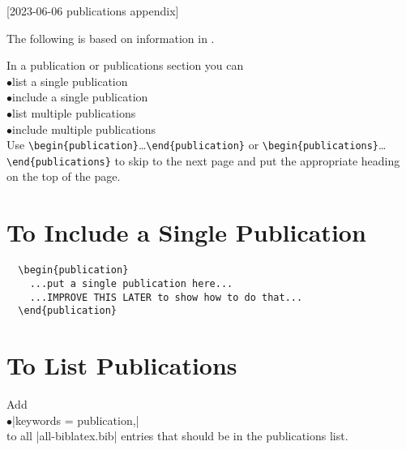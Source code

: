 [2023-06-06 publications appendix]

\index{\verb+\begin{publications}+}
    
The following is based on information in
\cite{template1,template2,template3}.

\renewcommand{\I}{\hspace*{2\ZZparindent}$\bullet$\hspace*{1.5em}}

In a publication or publications section you can\\
  \I list a single publication\\
  \I include a single publication\\
  \I list multiple publications\\
  \I include multiple publications\\
Use\newline
\hspace*{0.5in}\verb+\begin{publication}+\ldots\verb+\end{publication}+\newline
or\newline
\hspace*{0.5in}\verb+\begin{publications}+\ldots\verb+\end{publications}+\newline
to skip to the next page and put the appropriate heading on the
top of the page.

\vspace*{1.5\baselineskip}

\section*{To Include a Single Publication}

\begin{verbatim}
  \begin{publication}
    ...put a single publication here...
    ...IMPROVE THIS LATER to show how to do that...
  \end{publication}
\end{verbatim}


\section*{To List Publications}

Add\\
\I |keywords = {publication},|\\
to all
|all-biblatex.bib|
entries
that should be in the publications list.

\printbibliography
[
  keywords = {publication},
]

